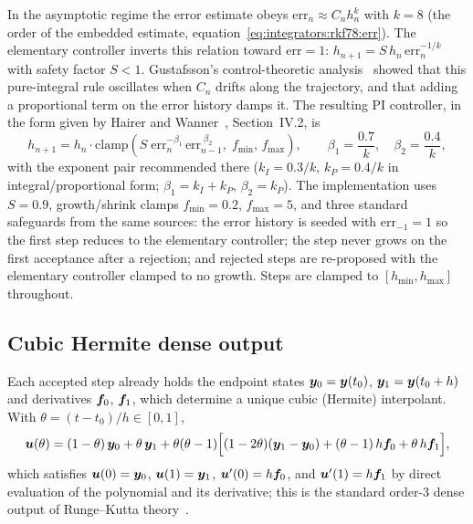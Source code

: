 In the asymptotic regime the error estimate obeys
$\mathrm{err}_n \approx C_n h_n^{k}$ with $k = 8$ (the order of the
embedded estimate, equation~\eqref{eq:integrators:rkf78:err}). The
elementary controller inverts this relation toward
$\mathrm{err} = 1$: $h_{n+1} = S\, h_n\, \mathrm{err}_n^{-1/k}$ with safety
factor $S < 1$. Gustafsson's control-theoretic analysis~%
\cite{gustafsson1991} showed that this pure-integral rule oscillates when
$C_n$ drifts along the trajectory, and that adding a proportional term on
the error history damps it. The resulting PI controller, in the form given
by Hairer and Wanner~\cite{hairer1996}, Section~IV.2, is
\begin{equation}
  h_{n+1} = h_n \cdot
    \mathrm{clamp}\!\left(
      S\; \mathrm{err}_n^{-\beta_1}\, \mathrm{err}_{n-1}^{\;\beta_2},\;
      f_{\min},\, f_{\max}\right),
  \qquad
  \beta_1 = \frac{0.7}{k}, \quad \beta_2 = \frac{0.4}{k},
  \label{eq:integrators:pi}
\end{equation}
with the exponent pair recommended there ($k_I = 0.3/k$, $k_P = 0.4/k$ in
integral/proportional form; $\beta_1 = k_I + k_P$, $\beta_2 = k_P$). The
implementation uses $S = 0.9$, growth/shrink clamps
$f_{\min} = 0.2$, $f_{\max} = 5$, and three standard safeguards from the
same sources: the error history is seeded with
$\mathrm{err}_{-1} = 1$ so the first step reduces to the elementary
controller; the step never grows on the first acceptance after a rejection;
and rejected steps are re-proposed with the elementary controller clamped to
no growth. Steps are clamped to $[h_{\min}, h_{\max}]$ throughout.

\subsection{Cubic Hermite dense output}
\label{sec:integrators:hermite}

Each accepted step already holds the endpoint states
$\bm{y}_0 = \bm{y}(t_0)$, $\bm{y}_1 = \bm{y}(t_0 + h)$ and derivatives
$\bm{f}_0$, $\bm{f}_1$, which determine a unique cubic (Hermite) interpolant.
With $\theta = (t - t_0)/h \in [0, 1]$,
\begin{equation}
  \bm{u}(\theta) = (1 - \theta)\,\bm{y}_0 + \theta\,\bm{y}_1
    + \theta(\theta - 1)\Bigl[(1 - 2\theta)(\bm{y}_1 - \bm{y}_0)
      + (\theta - 1)\, h \bm{f}_0 + \theta\, h \bm{f}_1\Bigr],
  \label{eq:integrators:hermite}
\end{equation}
which satisfies $\bm{u}(0) = \bm{y}_0$, $\bm{u}(1) = \bm{y}_1$,
$\bm{u}'(0) = h\bm{f}_0$, and $\bm{u}'(1) = h\bm{f}_1$ by direct evaluation
of the polynomial and its derivative; this is the standard order-3 dense
output of Runge--Kutta theory~\cite{hairer1993}.

